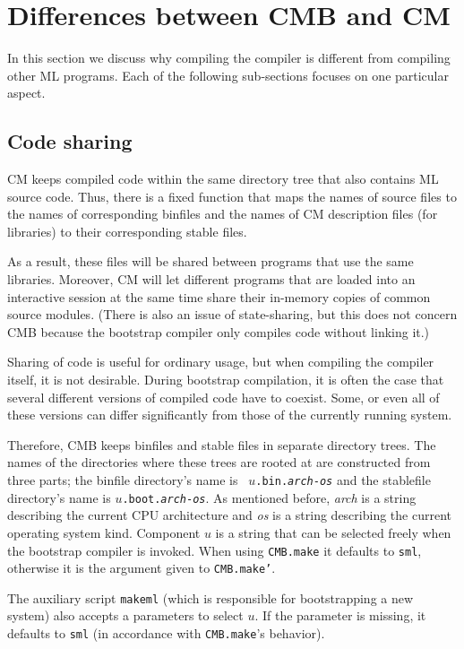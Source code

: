 
\section{Differences between CMB and CM}

In this section we discuss why compiling the compiler is different
from compiling other ML programs.  Each of the following sub-sections
focuses on one particular aspect.

\subsection{Code sharing}

CM keeps compiled code within the same directory tree that also
contains ML source code.  Thus, there is a fixed function that maps
the names of source files to the names of corresponding binfiles and
the names of CM description files (for libraries) to their
corresponding stable files.

As a result, these files will be shared between programs that use the
same libraries.  Moreover, CM will let different programs that are
loaded into an interactive session at the same time share their
in-memory copies of common source modules.  (There is also an issue of
state-sharing, but this does not concern CMB because the bootstrap
compiler only compiles code without linking it.)

Sharing of code is useful for ordinary usage, but when compiling the
compiler itself, it is not desirable.  During bootstrap compilation,
it is often the case that several different versions of compiled code
have to coexist.  Some, or even all of these versions can differ
significantly from those of the currently running system.

Therefore, CMB keeps binfiles and stable files in separate directory
trees.  The names of the directories where these trees are rooted at
are constructed from three parts; the binfile directory's name is {\tt
$u$.bin.{\it arch}-{\it os}} and the stablefile directory's name is
{\tt $u$.boot.{\it arch}-{\it os}}.  As mentioned before, {\it arch}
is a string describing the current CPU architecture and {\it os} is a
string describing the current operating system kind. Component $u$ is a
string that can be selected freely when the bootstrap compiler is
invoked.  When using {\tt CMB.make} it defaults to {\tt sml},
otherwise it is the argument given to {\tt CMB.make'}.

The auxiliary script {\tt makeml} (which is responsible for
bootstrapping a new system) also accepts a parameters to select $u$.
If the parameter is missing, it defaults to {\tt sml} (in accordance
with {\tt CMB.make}'s behavior).

